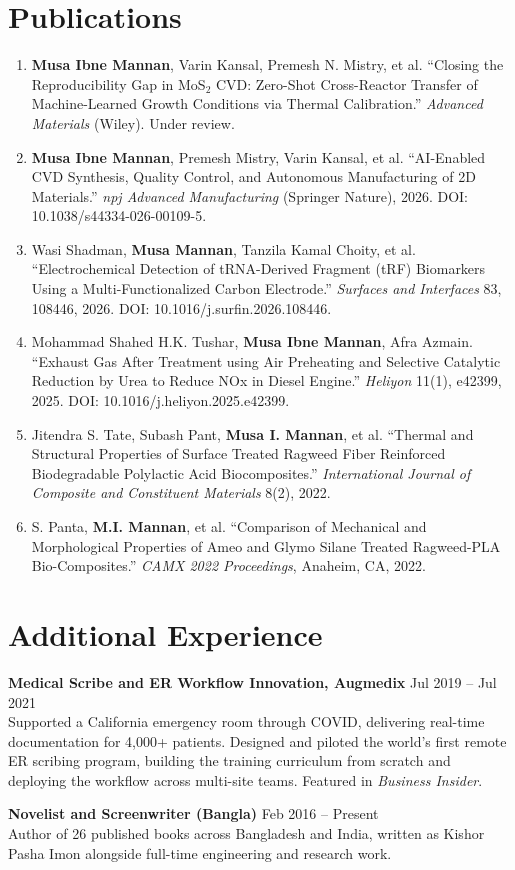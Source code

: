 \documentclass[11pt, letterpaper]{article}
\newcommand{\role}[2]{\textbf{#1} \hfill #2 \\}
\begin{document}
\section{Publications}
\begin{enumerate}
    \item \textbf{Musa Ibne Mannan}, Varin Kansal, Premesh N. Mistry, et al. ``Closing the Reproducibility Gap in MoS$_2$ CVD: Zero-Shot Cross-Reactor Transfer of Machine-Learned Growth Conditions via Thermal Calibration.'' \textit{Advanced Materials} (Wiley). Under review.
    \item \textbf{Musa Ibne Mannan}, Premesh Mistry, Varin Kansal, et al. ``AI-Enabled CVD Synthesis, Quality Control, and Autonomous Manufacturing of 2D Materials.'' \textit{npj Advanced Manufacturing} (Springer Nature), 2026. DOI: 10.1038/s44334-026-00109-5.
    \item Wasi Shadman, \textbf{Musa Mannan}, Tanzila Kamal Choity, et al. ``Electrochemical Detection of tRNA-Derived Fragment (tRF) Biomarkers Using a Multi-Functionalized Carbon Electrode.'' \textit{Surfaces and Interfaces} 83, 108446, 2026. DOI: 10.1016/j.surfin.2026.108446.
    \item Mohammad Shahed H.K. Tushar, \textbf{Musa Ibne Mannan}, Afra Azmain. ``Exhaust Gas After Treatment using Air Preheating and Selective Catalytic Reduction by Urea to Reduce NOx in Diesel Engine.'' \textit{Heliyon} 11(1), e42399, 2025. DOI: 10.1016/j.heliyon.2025.e42399.
    \item Jitendra S. Tate, Subash Pant, \textbf{Musa I. Mannan}, et al. ``Thermal and Structural Properties of Surface Treated Ragweed Fiber Reinforced Biodegradable Polylactic Acid Biocomposites.'' \textit{International Journal of Composite and Constituent Materials} 8(2), 2022.
    \item S. Panta, \textbf{M.I. Mannan}, et al. ``Comparison of Mechanical and Morphological Properties of Ameo and Glymo Silane Treated Ragweed-PLA Bio-Composites.'' \textit{CAMX 2022 Proceedings}, Anaheim, CA, 2022.
\end{enumerate}

\section{Additional Experience}
\role{Medical Scribe and ER Workflow Innovation, Augmedix}{Jul 2019 -- Jul 2021}
Supported a California emergency room through COVID, delivering real-time documentation for 4,000+ patients. Designed and piloted the world's first remote ER scribing program, building the training curriculum from scratch and deploying the workflow across multi-site teams. Featured in \textit{Business Insider}.

\role{Novelist and Screenwriter (Bangla)}{Feb 2016 -- Present}
Author of 26 published books across Bangladesh and India, written as Kishor Pasha Imon alongside full-time engineering and research work.
\end{document}
